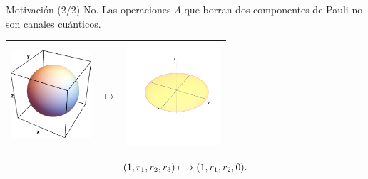 \documentclass[xcolor=dvipsnames,presentation]{beamer}%
\begin{document}
\begin{frame}{Motivación (2/2)}
	\alert{No.}
	Las operaciones $\Lambda$ que borran dos componentes de Pauli no 
	son canales cuánticos.
	\begin{center}
	\begin{tabular}{m{2.5cm} m{1.3cm} m{2.5cm}}
		\includegraphics[width=3cm]{unit_sph}
		& \hfill \LARGE{$\longmapsto$}
		& \includegraphics[width=3.5cm]{unit_disk_xy}
	\end{tabular}
	\end{center}
	\begin{align*}
	\qty(1,r_1,r_2,r_3)\longmapsto\qty(1,r_1,r_2,0).
	\end{align*}
	
	
		
	\vspace{.5cm}
\end{frame}
\end{document}
